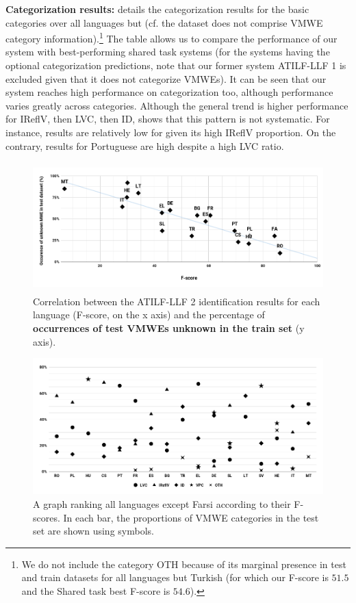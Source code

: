 \documentclass[output=paper,modfonts]{langscibook}
\begin{document}
\textbf{Categorization results: } details the categorization results for the basic categories over all languages but  (cf. the  dataset does not comprise VMWE category information).\footnote{We do not include the category OTH because of its marginal presence in test and train datasets for all languages but Turkish (for which our F-score is $51.5$ and the Shared task best F-score is $54.6$).} The table allows us to compare the performance of our system with best-performing shared task systems (for the systems having the optional categorization predictions, note that our former system ATILF-LLF 1 is excluded given that it does not categorize VMWEs). It can be seen that our system reaches high performance on categorization too, although performance varies greatly across categories. Although the general trend is higher performance for IReflV, then LVC, then ID,  shows that this pattern is not systematic. For instance, results are relatively low for  given its high IReflV proportion. On the contrary, results for Portuguese are high despite a high LVC ratio.
\begin{figure}
\includegraphics[height=5cm,keepaspectratio]{figures/alsaied-graph1.png}
\caption{Correlation between the ATILF-LLF 2 identification results for each language (F-score, on the x axis) and the percentage of \textbf{occurrences of test VMWEs unknown in the train set} (y axis).}
\label{fig:correlation}
\end{figure}
\begin{figure}
\includegraphics[width=\linewidth]{figures/alsaied-cats.png}
\caption{A graph ranking all languages except Farsi according to their F-scores. In each bar, the proportions of VMWE categories in the test set are shown using symbols.}
\label{fig:cats}
\end{figure}
\end{document}
